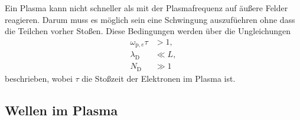 Ein Plasma kann nicht schneller als mit der Plasmafrequenz auf \"au\ss ere Felder reagieren.
Darum muss es m\"oglich sein eine Schwingung auszuf\"uehren ohne dass die Teilchen vorher Sto\ss en.
Diese Bedingungen werden \"uber die Ungleichungen
\begin{align}
\omega_{\text{p},e}\tau
&>1,
\label{eq:c1}\\
\lambda_\text{D}
&\ll L,
\label{eq:c2}\\
N_\text{D}
&\gg 1
\label{eq:c3}
\end{align}
beschrieben, wobei $\tau$ die Sto\ss zeit der Elektronen im Plasma ist.
\cite{stroth11a}

\subsection{Wellen im Plasma}



